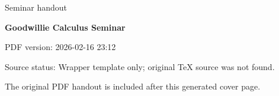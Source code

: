 \documentclass[11pt,a4paper]{article}
\newcommand{\seminartitle}{Goodwillie Calculus Seminar}
\newcommand{\seminarsubtitle}{Seminar handout}
\newcommand{\seminardate}{2026-02-16 23:12}
\newcommand{\seminarsourcestatus}{Wrapper template only; original TeX source was not found.}
\begin{document}
\begin{titlepage}
\thispagestyle{empty}
\vspace*{0.16\textheight}
{\Large\color{seminarblue}\seminarsubtitle\par}
\vspace{1.5em}
{\LARGE\bfseries \seminartitle\par}
\vspace{2em}
{\large PDF version: \seminardate\par}
\vfill
{\small Source status: \seminarsourcestatus\par}
\vspace{1em}
{\small The original PDF handout is included after this generated cover page.\par}
\end{titlepage}

\clearpage
\hypersetup{pageanchor=false}

\end{document}
